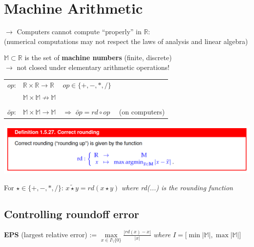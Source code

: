 \documentclass[12pt, a4paper]{article}
\newcommand{\R}{\mathbb{R}}
\newcommand{\M}{\mathbb{M}}
\begin{document}
\newpage
\section{Machine Arithmetic}

$\rightarrow$ Computers cannot compute “properly” in $\R$: \\
(numerical computations may not respect the laws of analysis and linear algebra)\newline

$\M \subset \R$ is the set of \textbf{machine numbers} (finite, discrete) \\
$\rightarrow$ not closed under elementary arithmetic operations! \\

\begin{tabular}{lll}
	$op$: 	& 		$\R \times \R \rightarrow \R$ & 			$op \in \lbrace +, -, *, / \rbrace$	\\
			& 		$\M \times \M \not\rightarrow \M$  											\\
																								\\
	$\widetilde{op}$: &  		$\M \times \M \rightarrow \M$ 	& $\Rightarrow$ $\widetilde{op} = rd \circ op \quad $ (on computers) 
\end{tabular}

\begin{center}
	\includegraphics[width=1.0\textwidth]{rounding_function.png}
\end{center}

\begin{tcolorbox}
\hspace{3mm}	
	For $\star \in \lbrace +, -, *, / \rbrace$: \quad $x \widetilde{\star} y = rd(x \star y)$  \quad \textit{where rd(...) is the rounding function} 
\hspace{3mm}	
\end{tcolorbox}
\hspace{3mm}	

\subsection{Controlling roundoff error}	
\textbf{EPS} (largest relative error) := $\max\limits_{x \in I\setminus \lbrace 0 \rbrace} \frac{|rd(x) - x|}{|x|}$ \quad \textit{where $I = \lbrack \min |\M|, \max |\M| \rbrack$}
\\
\end{document}
